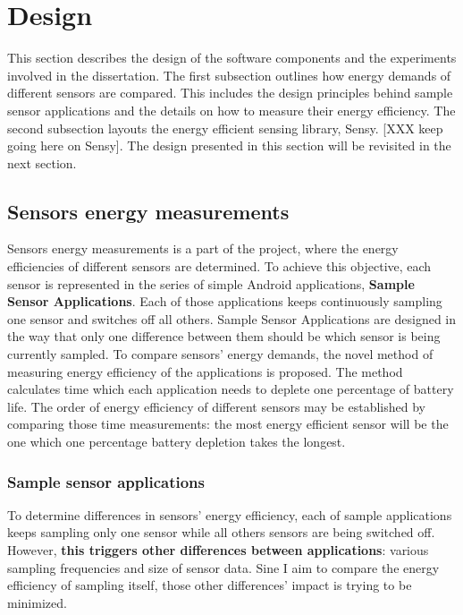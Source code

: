 \section{Design}
\label{s:design}
\hspace{10pt} This section describes the design of the software components and the experiments involved in the dissertation. The first subsection outlines how energy demands of different sensors are compared. This includes the design principles behind sample sensor applications and the details on how to measure their energy efficiency. The second subsection layouts the energy efficient sensing library, Sensy. [XXX keep going here on Sensy]. The design presented in this section will be revisited in the next section.

\subsection{Sensors energy measurements}
\label{s:design:measurements}
\hspace{10pt} Sensors energy measurements is a part of the project, where the energy efficiencies of different sensors are determined. To achieve this objective, each sensor is represented in the series of simple Android applications, \textbf{Sample Sensor Applications}. Each of those applications keeps continuously sampling one sensor and switches off all others. Sample Sensor Applications are designed in the way that only one difference between them should be which sensor is being currently sampled. To compare sensors' energy demands, the novel method of measuring energy efficiency of the applications is proposed. The method calculates time which each application needs to deplete one percentage of battery life. The order of energy efficiency of different sensors may be established by comparing those time measurements: the most energy efficient sensor will be the one which one percentage battery depletion takes the longest. 

\subsubsection{Sample sensor applications}
\label{s:design:measurements:sampleapps}
\hspace{10pt} To determine differences in sensors' energy efficiency, each of sample applications keeps sampling only one sensor while all others sensors are being switched off.  However, \textbf{this triggers other differences between applications}: various sampling frequencies and size of sensor data. Sine I aim to compare the energy efficiency of sampling itself, those other differences' impact is trying to be minimized. 

